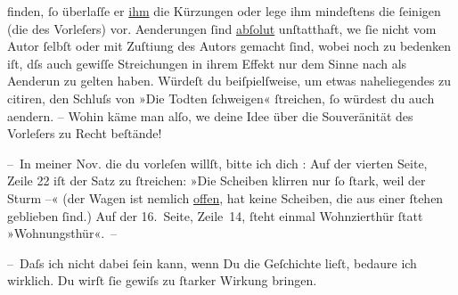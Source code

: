               finden, ſo überlaſſe er \uline{ihm} die Kürzungen oder lege
               ihm mindeſtens die ſeinigen (die des Vorleſers) vor. Aenderungen ſind \uline{abſolut} unſtatthaft, we{\geminationn}{ }ſie nicht vom Autor ſelbſt oder mit Zuſti{\geminationm}ung des Autors gemacht ſind, wobei noch zu bedenken
               iſt, dſs auch gewiſſe Streichungen in ihrem Effekt nur dem {\pb}Sinne nach als
                  Aenderun zu gelten haben. Würdeſt du beiſpielſweise, um etwas naheliegendes zu
               citiren, den Schluſs von »Die Todten ſchweigen«
               ſtreichen, ſo würdest du auch aendern. – Wohin käme man \introOben{}alſo\introOben{}, we{\geminationn} deine Idee über die Souveränität des
               Vorleſers zu Recht beſtände!\pend
           
\pstart
           – In meiner Nov. die du vorleſen willſt, bitte ich dich \label{K_L00740-1v}\label{K_L00740-1}:
               Auf der vierten Seite, Zeile 22 iſt der Satz zu ſtreichen: »Die Scheiben klirren nur
               ſo ſtark, weil der Sturm –« (der Wagen ist nemlich \uline{offen}, hat keine {\pb}Scheiben, die aus einer
                  \label{K_L00740-2v}\label{K_L00740-2}{ }ſtehen geblieben ſind.) Auf der 16. Seite,
               Zeile 14, ſteht einmal Wohnzi{\geminationm}erthür ſtatt
               »Wohnungsthür«. –\pend
           
\pstart
           – Daſs ich nicht dabei ſein kann, wenn Du die Geſchichte lieſt, bedaure ich wirklich. Du wirſt ſie gewiſs
               zu ſtarker Wirkung bringen.\pend
           
